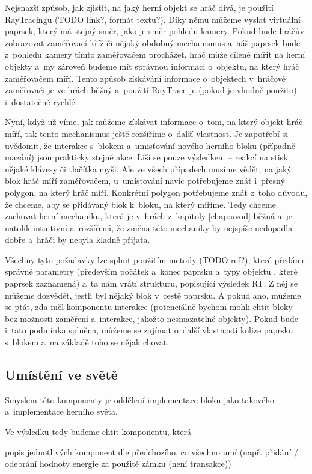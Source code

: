 Nejsnazší způsob, jak zjistit, na jaký herní objekt se hráč dívá, je použití RayTracingu (TODO link?, formát textu?). Díky němu můžeme  vyslat virtuální paprsek, který má stejný směr, jako je směr pohledu kamery. Pokud bude hráčův \HUD{} zobrazovat zaměřovací kříž či nějaký obdobný mechanismus a~náš paprsek bude z~pohledu kamery tímto zaměřovačem procházet, hráč může cíleně mířit na herní objekty a~my zároveň budeme mít správnou informaci o~objektu, na který hráč zaměřovačem míří. Tento způsob získávání informace o~objektech v~hráčově zaměřovači je ve hrách běžný a~použití RayTrace je (pokud je vhodně použito) i~dostatečně rychlé.

Nyní, když už víme, jak můžeme získávat informace o~tom, na který objekt hráč míří, tak tento mechanismus ještě rozšíříme o~další vlastnost. Je zapotřebí si uvědomit, že interakce s~blokem a~umisťování nového herního bloku (případně mazání) jsou prakticky stejné akce. Liší se pouze výsledkem -- reakcí na stisk nějaké klávesy či tlačítka myši. Ale ve všech případech musíme vědět, na jaký blok hráč míří zaměřovačem, u~umisťování navíc potřebujeme znát i~přesný polygon, na který hráč míří. Konkrétní polygon potřebujeme znát z~toho důvodu, že chceme, aby se přidávaný blok  k~bloku, na který míříme. Tedy chceme zachovat herní mechaniku, která je v~hrách z~kapitoly \ref{chap:uvod} běžná a~je natolik intuitivní a~rozšířená, že změna této mechaniky by nejspíše nedopadla dobře a~hráči by nebyla kladně přijata.

Všechny tyto požadavky lze splnit použitím metody  (TODO ref?), které předáme správné parametry (především počátek a~konec paprsku a~typy objektů , které paprsek zaznamená) a~ta nám vrátí strukturu, popisující výsledek RT. Z něj se můžeme dozvědět, jestli byl nějaký blok v~cestě paprsku. A pokud ano, můžeme se ptát, zda měl komponentu interakce (potenciálně bychom mohli chtít bloky bez možnosti zaměření a~interakce, jakožto nesmazatelné objekty). Pokud bude i~tato podmínka splněna, můžeme se zajímat o~další vlastnosti kolize paprsku s~blokem a~na základě toho se nějak chovat.


\subsection{Umístění ve světě}

Smyslem této komponenty je oddělení implementace bloku jako takového a~implementace herního světa.


Ve výsledku tedy budeme chtít komponentu, která 

popis jednotlivých komponent dle předchozího, co všechno umí (např. přidání / odebrání hodnoty energie za použité zámku (není transakce))



